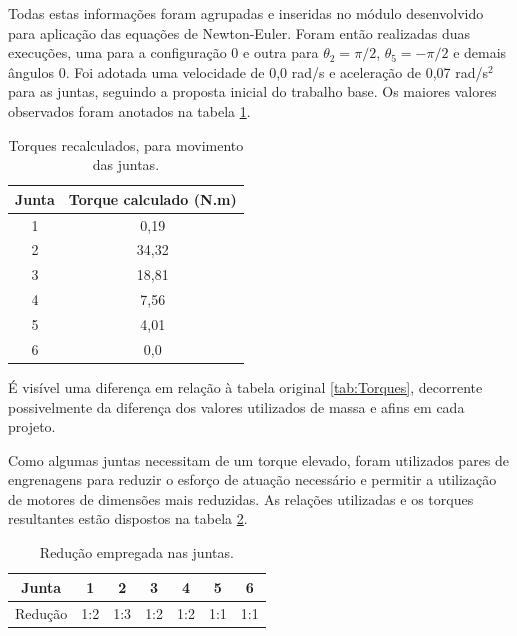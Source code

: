 Todas estas informações foram agrupadas e inseridas no módulo desenvolvido para aplicação 
das equações de Newton-Euler. Foram então realizadas duas execuções, uma para a configuração 0
e outra para $\theta_2 = \pi/2$, $\theta_5 = -\pi/2$ e demais ângulos 0. Foi adotada uma 
velocidade de 0,0 rad/s e aceleração de 0,07 rad/s$^2$ para as juntas, seguindo a proposta
inicial do trabalho base. Os maiores valores observados foram anotados na tabela 
\ref{tab:Torques-Novo}. 

\begin{table}[htb]
    \begin{centering}    
    
    \caption{Torques recalculados, para movimento das juntas.}
    
    \begin{tabular}{|c|c|}
        \hline
        Junta & Torque calculado (N.m) \tabularnewline
        \hline
        \hline
        1 & 0,19 \tabularnewline
        \hline
        2 & 34,32 \tabularnewline
        \hline
        3 & 18,81 \tabularnewline
        \hline
        4 & 7,56 \tabularnewline
        \hline
        5 & 4,01 \tabularnewline
        \hline
        6 & 0,0  \tabularnewline
        \hline
    \end{tabular}
    
    \label{tab:Torques-Novo}
    
\par\end{centering}
\end{table}

É visível uma diferença em relação à tabela original \ref{tab:Torques}, 
decorrente possivelmente da diferença dos valores utilizados de massa e 
afins em cada projeto.

Como algumas juntas necessitam de um torque elevado, foram utilizados pares de 
engrenagens para reduzir o esforço de atuação necessário e permitir a utilização
de motores de dimensões mais reduzidas. As relações utilizadas e os torques 
resultantes estão dispostos na tabela \ref{tab:TorquesReducao}. 

\begin{table}[h]
\begin{centering}    
    
\begin{tabular}{|c|c|c|c|c|c|c|}
    \hline
    Junta & 1 & 2 & 3 & 4 & 5 & 6 \tabularnewline
    \hline
    Redução & 1:2 & 1:3 & 1:2 & 1:2 & 1:1 & 1:1 \tabularnewline
    \hline
\end{tabular}

\caption{Redução empregada nas juntas.}
\label{tab:TorquesReducao}

\par\end{centering}
\end{table}

